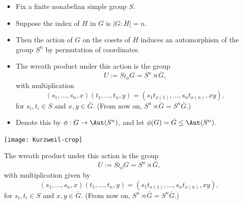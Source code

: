 \begin{frame}[label=IEPropsLemma2Alt]{}
  \begin{itemize}
  \item Fix a finite nonabelian simple group $S$. 
\vskip2mm
\item Suppose the index of $H$ in $G$ is $|G:H| = n$.
\vskip2mm
\item Then the action of $G$ on the cosets of $H$ induces an automorphism of the
group $S^n$ by permutation of coordinates.  
\vskip2mm
\item  The wreath product under this action is the group
  \[
  U := S\wr_\phi G =  S^n \rtimes \bar{G}, %
  \]
  with multiplication
  \[
  (s_1, \dots, s_n, x) (t_1, \dots, t_n, y) = 
  (s_1 t_{x(1)}, \dots, s_nt_{x(n)}, x y),
  \]
  for $s_i, t_i \in S$ and $x, y \in \bar{G}$.
  (From now on, $S^n \rtimes \bar{G} = S^n\bar{G}$.)
\item Denote this by  $\phi: G \rightarrow \Aut(S^n)$, 
  and let $\phi(G) = \bar{G} \leq \Aut(S^n)$.  
  \end{itemize}
\end{frame}


\begin{frame}[fragile,label=IEPropsLemma2Prezi]{}
  \begin{center}
\texttt{[image: Kurzweil-crop]}
  \end{center}
\end{frame}


\begin{frame}[label=IEPropsLemma2Wreath]{}
  The wreath product under this action is the group
  \[
  U := S\wr_\phi G =  S^n \rtimes \bar{G}, %
  \]
  with multiplication given by
  \[
  (s_1, \dots, s_n, x) (t_1, \dots, t_n, y) = 
  (s_1 t_{x(1)}, \dots, s_nt_{x(n)}, x y),
  \]
  for $s_i, t_i \in S$ and $x, y \in \bar{G}$.
  (From now on, $S^n \rtimes \bar{G} = S^n\bar{G}$.)
\end{frame}

